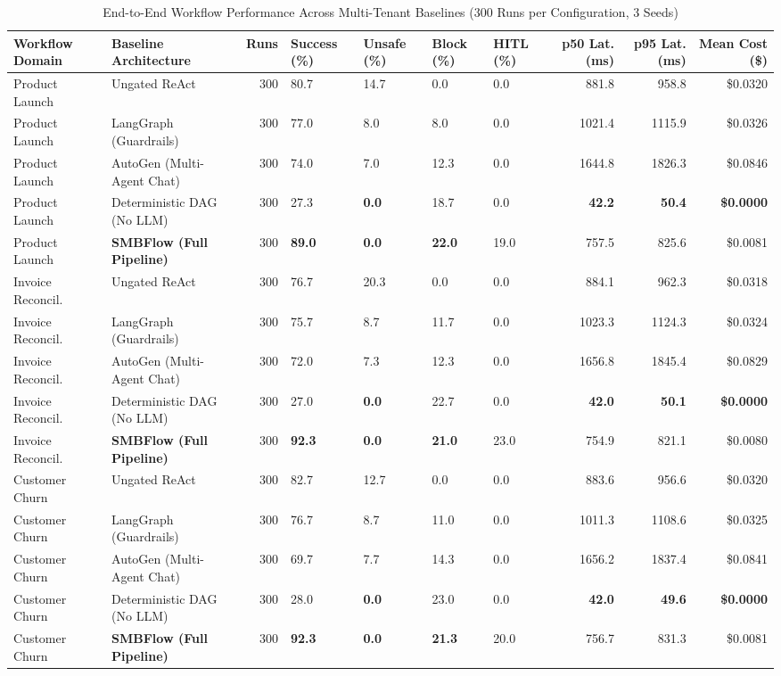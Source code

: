 \documentclass[conference]{IEEEtran}
\begin{document}
\begin{table}[t]
\caption{End-to-End Workflow Performance Across Multi-Tenant Baselines (300 Runs per Configuration, 3 Seeds)}
\label{tab:main_results}
\centering
\scriptsize
\setlength{\tabcolsep}{3.5pt}
\begin{tabularx}{\linewidth}{l l r Y Y Y Y r r r}
\toprule
\textbf{Workflow Domain} & \textbf{Baseline Architecture} & \textbf{Runs} & \textbf{Success (\%)} & \textbf{Unsafe (\%)} & \textbf{Block (\%)} & \textbf{HITL (\%)} & \textbf{p50 Lat. (ms)} & \textbf{p95 Lat. (ms)} & \textbf{Mean Cost (\$)} \\
\midrule
Product Launch & Ungated ReAct~\cite{yao2023react} & 300 & 80.7 & 14.7 & 0.0 & 0.0 & 881.8 & 958.8 & \$0.0320 \\
Product Launch & LangGraph (Guardrails)~\cite{langgraph2024} & 300 & 77.0 & 8.0 & 8.0 & 0.0 & 1021.4 & 1115.9 & \$0.0326 \\
Product Launch & AutoGen (Multi-Agent Chat)~\cite{wu2023autogen} & 300 & 74.0 & 7.0 & 12.3 & 0.0 & 1644.8 & 1826.3 & \$0.0846 \\
Product Launch & Deterministic DAG (No LLM) & 300 & 27.3 & \textbf{0.0} & 18.7 & 0.0 & \textbf{42.2} & \textbf{50.4} & \textbf{\$0.0000} \\
Product Launch & \textbf{SMBFlow (Full Pipeline)} & 300 & \textbf{89.0} & \textbf{0.0} & \textbf{22.0} & 19.0 & 757.5 & 825.6 & \$0.0081 \\
\midrule
Invoice Reconcil. & Ungated ReAct~\cite{yao2023react} & 300 & 76.7 & 20.3 & 0.0 & 0.0 & 884.1 & 962.3 & \$0.0318 \\
Invoice Reconcil. & LangGraph (Guardrails)~\cite{langgraph2024} & 300 & 75.7 & 8.7 & 11.7 & 0.0 & 1023.3 & 1124.3 & \$0.0324 \\
Invoice Reconcil. & AutoGen (Multi-Agent Chat)~\cite{wu2023autogen} & 300 & 72.0 & 7.3 & 12.3 & 0.0 & 1656.8 & 1845.4 & \$0.0829 \\
Invoice Reconcil. & Deterministic DAG (No LLM) & 300 & 27.0 & \textbf{0.0} & 22.7 & 0.0 & \textbf{42.0} & \textbf{50.1} & \textbf{\$0.0000} \\
Invoice Reconcil. & \textbf{SMBFlow (Full Pipeline)} & 300 & \textbf{92.3} & \textbf{0.0} & \textbf{21.0} & 23.0 & 754.9 & 821.1 & \$0.0080 \\
\midrule
Customer Churn & Ungated ReAct~\cite{yao2023react} & 300 & 82.7 & 12.7 & 0.0 & 0.0 & 883.6 & 956.6 & \$0.0320 \\
Customer Churn & LangGraph (Guardrails)~\cite{langgraph2024} & 300 & 76.7 & 8.7 & 11.0 & 0.0 & 1011.3 & 1108.6 & \$0.0325 \\
Customer Churn & AutoGen (Multi-Agent Chat)~\cite{wu2023autogen} & 300 & 69.7 & 7.7 & 14.3 & 0.0 & 1656.2 & 1837.4 & \$0.0841 \\
Customer Churn & Deterministic DAG (No LLM) & 300 & 28.0 & \textbf{0.0} & 23.0 & 0.0 & \textbf{42.0} & \textbf{49.6} & \textbf{\$0.0000} \\
Customer Churn & \textbf{SMBFlow (Full Pipeline)} & 300 & \textbf{92.3} & \textbf{0.0} & \textbf{21.3} & 20.0 & 756.7 & 831.3 & \$0.0081 \\
\bottomrule
\end{tabularx}
\end{table}
\end{document}
